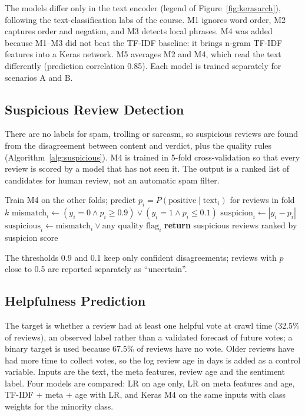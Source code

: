 The models differ only in the text encoder (legend of Figure~\ref{fig:kerasarch}), following the text-classification labs of the course. M1 ignores word order, M2 captures order and negation, and M3 detects local phrases. M4 was added because M1--M3 did not beat the TF-IDF baseline: it brings n-gram TF-IDF features into a Keras network. M5 averages M2 and M4, which read the text differently (prediction correlation 0.85). Each model is trained separately for scenarios A and B.

\subsection{Suspicious Review Detection}

There are no labels for spam, trolling or sarcasm, so suspicious reviews are found from the disagreement between content and verdict, plus the quality rules (Algorithm~\ref{alg:suspicious}). M4 is trained in 5-fold cross-validation so that every review is scored by a model that has not seen it. The output is a ranked list of candidates for human review, not an automatic spam filter.

\begin{algorithm}[!htbp]
\caption{Suspicious review detection}
\label{alg:suspicious}
\begin{algorithmic}[1]
    \State Train M4 on the other folds; predict $p_i = P(\text{positive} \mid \text{text}_i)$ for reviews in fold $k$
\EndFor
{}
    \State $\text{mismatch}_i \gets (y_i = 0 \land p_i \geq 0.9) \lor (y_i = 1 \land p_i \leq 0.1)$
    \State $\text{suspicion}_i \gets |y_i - p_i|$ 
    \State $\text{suspicious}_i \gets \text{mismatch}_i \lor \text{any quality flag}_i$
\EndFor
\State \textbf{return} suspicious reviews ranked by suspicion score
\end{algorithmic}
\end{algorithm}

The thresholds 0.9 and 0.1 keep only confident disagreements; reviews with $p$ close to 0.5 are reported separately as ``uncertain''.

\subsection{Helpfulness Prediction}

The target is whether a review had at least one helpful vote at crawl time (32.5\% of reviews), an observed label rather than a validated forecast of future votes; a binary target is used because 67.5\% of reviews have no vote. Older reviews have had more time to collect votes, so the log review age in days is added as a control variable. Inputs are the text, the meta features, review age and the sentiment label. Four models are compared: LR on age only, LR on meta features and age, TF-IDF + meta + age with LR, and Keras M4 on the same inputs with class weights for the minority class.

